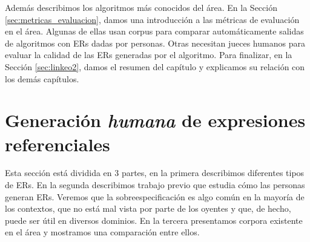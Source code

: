 Adem\'as describimos  los algoritmos m\'as conocidos del \'area. En la Secci\'on \ref{sec:metricas_evaluacion}, damos una introducci\'on a las m\'etricas de evaluaci\'on en el \'area. Algunas de ellas usan corpus para comparar autom\'aticamente salidas de algoritmos con ERs dadas por personas. Otras necesitan jueces humanos para evaluar la calidad de las ERs generadas por el algoritmo. Para finalizar, en la Secci\'on \ref{sec:linkeo2}, damos el resumen del cap\'itulo y explicamos su relaci\'on con los dem\'as cap\'itulos.


\section{Generaci\'on \emph{humana} de expresiones referenciales}
\label{generacion-humana}

Esta secci\'on est\'a dividida en 3 partes, en la primera describimos diferentes tipos de ERs. En la segunda describimos trabajo previo que estudia c\'omo las personas generan ERs. Veremos que la sobreespecificaci\'on es algo com\'un en la mayor\'ia de los contextos, que no est\'a mal vista por parte de los oyentes y que, de hecho, puede ser \'util en diversos dominios. En la tercera presentamos corpora existente en el \'area y mostramos una comparaci\'on entre ellos.


